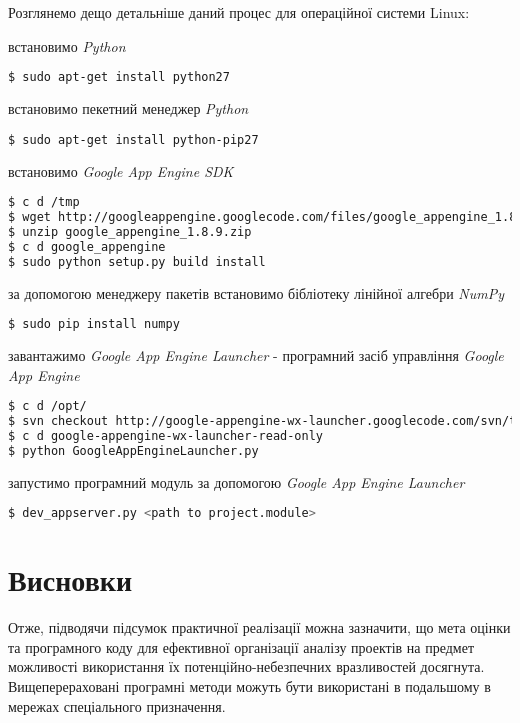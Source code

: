 Розглянемо дещо детальніше даний процес для операційної системи Linux:

встановимо {\it Python}
\begin{lstlisting}[language=bash] 
$ sudo apt-get install python27
\end{lstlisting}

встановимо пекетний менеджер {\it Python}
\begin{lstlisting}[language=bash] 
$ sudo apt-get install python-pip27
\end{lstlisting}

встановимо {\it Google App Engine SDK}
\begin{lstlisting}[language=bash] 
$ c d /tmp
$ wget http://googleappengine.googlecode.com/files/google_appengine_1.8.9.zip
$ unzip google_appengine_1.8.9.zip
$ c d google_appengine
$ sudo python setup.py build install
\end{lstlisting}

за допомогою менеджеру пакетів встановимо бібліотеку лінійної алгебри {\it NumPy}
\begin{lstlisting}[language=bash] 
$ sudo pip install numpy
\end{lstlisting}

завантажимо {\it Google App Engine Launcher} - програмний засіб управління {\it Google App Engine}
\begin{lstlisting}[language=bash] 
$ c d /opt/
$ svn checkout http://google-appengine-wx-launcher.googlecode.com/svn/trunk/ google-appengine-wx-launcher-read-only
$ c d google-appengine-wx-launcher-read-only
$ python GoogleAppEngineLauncher.py
\end{lstlisting}

запустимо програмний модуль за допомогою {\it Google App Engine Launcher}
\begin{lstlisting}[language=bash] 
$ dev_appserver.py <path to project.module>
\end{lstlisting}

\pagebreak

\section*{Висновки}
Отже, підводячи підсумок практичної реалізації можна зазначити, що мета оцінки та програмного коду для ефективної організації аналізу проектів на предмет можливості використання їх потенційно-небезпечних вразливостей досягнута. Вищеперераховані програмні методи можуть бути використані в подальшому в мережах спеціального призначення.
